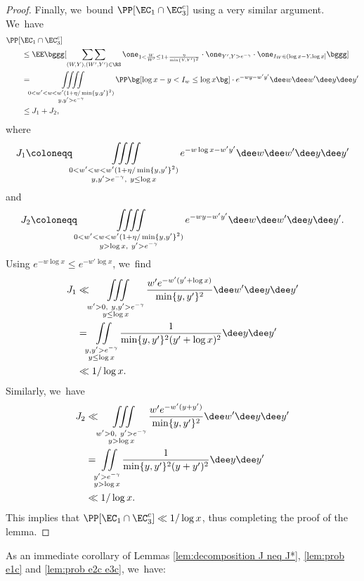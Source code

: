 \begin{proof}
Finally, we~bound $\PP[\EC_1 \cap \EC_3^c]$ using a very similar argument. We~have
\[
\begin{split}
&\PP[\EC_1 \cap \EC_3^c] \\
&\qquad \le
\EE\bggg[ \mathop{\sum\sum}_{(W,Y),(W',Y') \in\RS} \one_{1<\frac{W}{W'}\le 1+\frac{\eta}{\min\{Y,Y'\}^2}}\cdot\one_{Y',Y>e^{-\gamma}} \cdot \one_{I_W\in(\log x-Y,\log x]} \bggg] \\
&\qquad =
\iiiint\limits_{\substack{0 < w'<w < w'(1+\eta/\min\{y,y'\}^2)\\ y, y' > e^{-\gamma}}} \PP\bg[\log x - y<I_w \le \log x\bg]\cdot e^{-wy-w'y'}
\dee w\dee w'\dee y\dee y' \\
&\qquad \le J_1+J_2,
\end{split}
\]
where
\[
J_1 \coloneqq \iiiint\limits_{\substack{0 < w'<w < w'(1+\eta/\min\{y,y'\}^2)\\ y, y' > e^{-\gamma},\ y\le \log x}} e^{-w\log x-w'y'}
\dee w\dee w'\dee y\dee y'
\]
and
\[
J_2 \coloneqq \iiiint\limits_{\substack{0 < w'<w < w'(1+\eta/\min\{y,y'\}^2)\\ y>\log x,\ y' > e^{-\gamma}}} e^{-wy-w'y'}
\dee w\dee w'\dee y\dee y'.
\]
Using $e^{-w\log x}\le e^{-w'\log x}$, we~find
\begin{align*}
J_1&\ll \iiint\limits_{\substack{w'>0,\ y, y' > e^{-\gamma}\\ y\le \log x}} \frac{w'e^{-w'(y'+\log x)}}{\min\{y,y'\}^2} \dee w'\dee y\dee y' \\
&= \iint\limits_{\substack{y, y' > e^{-\gamma} \\ y\le \log x}} \frac{1}{\min\{y,y'\}^2(y'+\log x)^2} \dee y\dee y'\\
& \ll1/\log x.
\end{align*}
Similarly, we~have
\begin{align*}
J_2&\ll \iiint\limits_{\substack{w'>0,\ y' > e^{-\gamma}\\ y>\log x}} \frac{w'e^{-w'(y+y')} }{\min\{y,y'\}^2} \dee w'\dee y\dee y' \\
&= \iint\limits_{\substack{y' > e^{-\gamma} \\ y>\log x}} \frac{1}{\min\{y,y'\}^2(y+y')^2} \dee y\dee y'\\
& \ll1/\log x.
\end{align*}
This implies that $\PP[\EC_1\cap\EC_3^c]\ll 1/\log x$, thus completing the proof of the lemma.
\end{proof}

As an immediate corollary of Lemmas \ref{lem:decomposition J neq J*}, \ref{lem:prob e1c} and \ref{lem:prob e2c e3c}, we~have:

